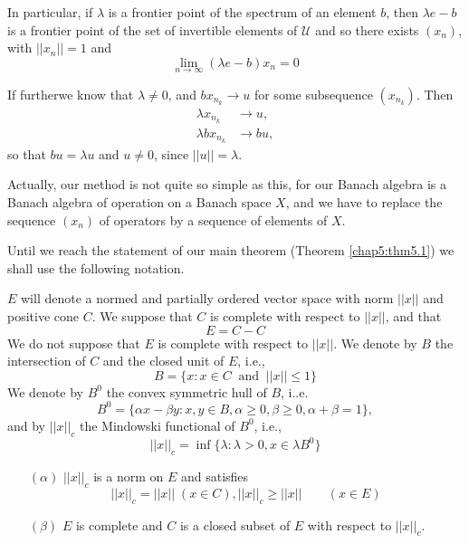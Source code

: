 In particular, if $\lambda$ is a frontier point of the spectrum of an
element $b$, then $\lambda e - b$ is a frontier point of the set of
invertible elements of $\mathcal{U}$ and so there exists $(x_n)$, with
$|| x_n || = 1$ and  
$$
\lim_{n \to \infty} (\lambda e - b) x_n = 0
$$

If further\pageoriginale we know that $\lambda \neq 0$, and $b x_{n_k}
\to u$ for some subsequence $(x_{n_k})$. Then  
\begin{align*}
  \lambda x_{n_k} & \to u ,\\
  \lambda b x_{n_k} & \to bu ,
\end{align*}
so that $bu = \lambda u$ and $u \neq 0$, since $|| u || = \lambda$.

Actually, our method is not quite so simple as this, for our Banach
algebra is a Banach algebra of operation on a Banach space $X$, and we
have to replace the sequence $(x_n)$ of operators by a sequence of
elements of $X$. 

Until we reach the statement of our main theorem (Theorem
\ref{chap5:thm5.1}) we 
shall use the following notation. 

$E$ will denote a normed and partially ordered vector space with norm
$|| x ||$ and positive cone $C$. We suppose that $C$ is complete with
respect to $|| x ||$, and that 
$$
E = C - C
$$
We do not suppose that $E$ is complete with respect to $|| x ||$. We
denote by $B$ the intersection of $C$ and the closed unit of $E$,
i.e., 
$$
B = \{ x : x \in C ~ \text{ and } ~ || x || \leq 1\}
$$
We denote by $B^0$ the convex symmetric hull of $B$, i..e.
$$
B^0 = \{ \alpha x - \beta y : x, y \in B, \alpha \geq 0, \beta \geq 0,
\alpha + \beta = 1 \}, 
$$\pageoriginale
and by $|| x ||_c$ the Mindowski functional of $B^0$, i.e.,
$$
|| x ||_c = \inf \{ \lambda : \lambda > 0, x \in \lambda B^0 \}
$$

\setcounter{section}{5}
\setcounter{lemma}{0}
\begin{lemma}%
  \begin{enumerate}
  \item[$(\alpha)$] $ || x ||_c$ is a norm on $E$ and satisfies 
    $$
    || x ||_c = || x || \; (x \in C) , || x ||_c \geq || x || \qquad (x \in E)
    $$

  \item[$(\beta)$] $E$  is complete and $C$ is a closed subset of $E$
    with respect to $|| x ||_c$. 
  \end{enumerate}
\end{lemma}

